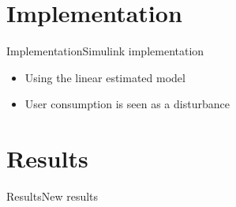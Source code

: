 \section{Implementation}

\begin{frame}{Implementation}{Simulink implementation}

\begin{itemize}
	\item<1-> Using the linear estimated model 
	\item<1-> User consumption is seen as a disturbance  
\end{itemize}

\begin{figure}[H]
\centering
 
\end{figure}

\end{frame}




\section{Results}

\begin{frame}{Results}{New results}
\end{frame}


